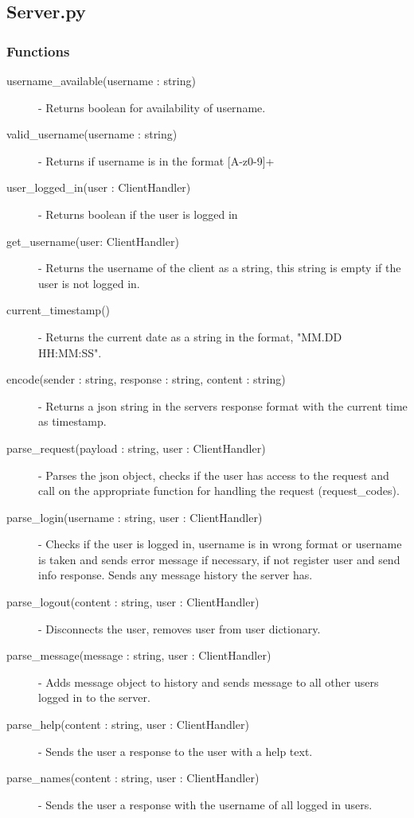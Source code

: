\documentclass[a4paper, 12pt]{article}
\begin{document}
    \subsection{Server.py}
        \subsubsection{Functions}
            \begin{description}
                \item[username\_available(username : string)] - Returns boolean for availability of username.
                \item[valid\_username(username : string)] - Returns if username is in the format [A-z0-9]+
                \item[user\_logged\_in(user : ClientHandler)] - Returns boolean if the user is logged in
                \item[get\_username(user: ClientHandler)] - Returns the username of the client as a string, this string is empty if the user is not logged in.
                \item[current\_timestamp()] - Returns the current date as a string in the format, "MM.DD HH:MM:SS".
                \item[encode(sender : string, response : string, content : string)] - Returns a json string in the servers response format with the current time as timestamp.
                \item[parse\_request(payload : string, user : ClientHandler)] - Parses the json object, checks if the user has access to the request and call on the appropriate function for handling the request (request\_codes).
                \item[parse\_login(username : string, user : ClientHandler)] - Checks if the user is logged in, username is in wrong format or username is taken and sends error message if necessary, if not register user and send info response. Sends any message history the server has.
                \item[parse\_logout(content : string, user : ClientHandler)] - Disconnects the user, removes user from user dictionary.
                \item[parse\_message(message : string, user : ClientHandler)] - Adds message object to history and sends message to all other users logged in to the server.
                \item[parse\_help(content : string, user : ClientHandler)] - Sends the user a response to the user with a help text.
                \item[parse\_names(content : string, user : ClientHandler)] - Sends the user a response with the username of all logged in users.
            \end{description}
\end{document}

